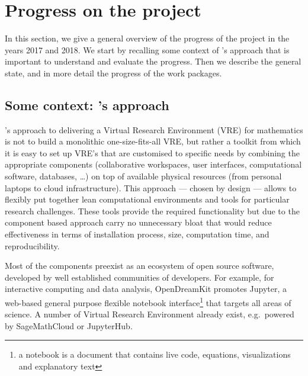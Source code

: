 \documentclass{deliverablereport}
\author{Nicolas M. Thiéry, Benoît Pilorget, et al.}
\begin{document}
\enlargethispage{4ex}
\maketitle
\githubissuedescription
\tableofcontents\newpage

\section{Progress on the project}

In this section, we give a general overview of the progress of the
project in the years 2017 and 2018. We start by recalling some context of \ODK's
approach that is important to understand and evaluate the
progress. Then we describe the general state, and in more detail
the progress of the work packages.

\subsection{Some context: \ODK's approach}
\ODK's approach to delivering a Virtual Research Environment (VRE) for
mathematics is not to build a monolithic one-size-fits-all VRE, but
rather a toolkit from which it is easy to set up VRE's that are
customised to specific needs by combining the appropriate components
(collaborative workspaces, user interfaces, computational software,
databases, \dots) on top of available physical resources (from
personal laptops to cloud infrastructure). This approach --- chosen by
design --- allows to flexibly put together lean computational
environments and tools for particular research challenges. These tools
provide the required functionality but due to the component based
approach carry no unnecessary bloat that would reduce effectiveness in
terms of installation process, size, computation time, and
reproducibility.

Most of the components preexist as an ecosystem of open source
software, developed by well established communities of developers. For
example, for interactive computing and data analysis, OpenDreamKit
promotes Jupyter, a web-based general purpose flexible notebook
interface\footnote{a notebook is a document that contains live code,
  equations, visualizations and explanatory text} that targets all
areas of science. A number of Virtual Research Environment already
exist, e.g.\ powered by SageMathCloud or JupyterHub.
\end{document}
